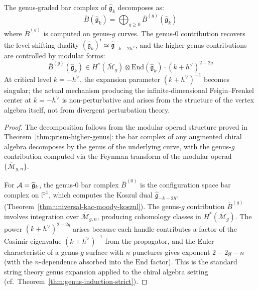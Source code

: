 \begin{theorem}\label{thm:km-higher-genus-corrections}
The genus-graded bar complex of $\widehat{\mathfrak{g}}_k$ decomposes as:
\begin{equation}
\bar{B}(\widehat{\mathfrak{g}}_k) = \bigoplus_{g \geq 0} \bar{B}^{(g)}(\widehat{\mathfrak{g}}_k)
\end{equation}
where $\bar{B}^{(g)}$ is computed on genus-$g$ curves.  The genus-$0$ contribution recovers the level-shifting duality $(\widehat{\mathfrak{g}}_k)^! \simeq \widehat{\mathfrak{g}}_{-k-2h^\vee}$, and the higher-genus contributions are controlled by modular forms:
\begin{equation}
\bar{B}^{(g)}(\widehat{\mathfrak{g}}_k) \in H^*(\overline{\mathcal{M}}_g) \otimes \mathrm{End}(\widehat{\mathfrak{g}}_k) \cdot (k+h^\vee)^{2-2g}
\end{equation}
At critical level $k = -h^\vee$, the expansion parameter $(k+h^\vee)^{-1}$ becomes singular; the actual mechanism producing the infinite-dimensional Feigin--Frenkel center at $k = -h^\vee$ is non-perturbative and arises from the structure of the vertex algebra itself, not from divergent perturbation theory.
\end{theorem}

\begin{proof}
The decomposition follows from the modular operad structure proved in Theorem~\ref{thm:prism-higher-genus}: the bar complex of any augmented chiral algebra decomposes by the genus of the underlying curve, with the genus-$g$ contribution computed via the Feynman transform of the modular operad $\{\overline{\mathcal{M}}_{g,n}\}$.

For $\mathcal{A} = \widehat{\mathfrak{g}}_k$, the genus-0 bar complex $\bar{B}^{(0)}$ is the configuration space bar complex on $\mathbb{P}^1$, which computes the Koszul dual $\widehat{\mathfrak{g}}_{-k-2h^\vee}$ (Theorem~\ref{thm:universal-kac-moody-koszul}).  The genus-$g$ contribution $\bar{B}^{(g)}$ involves integration over $\overline{\mathcal{M}}_{g,n}$, producing cohomology classes in $H^*(\overline{\mathcal{M}}_g)$.  The power $(k+h^\vee)^{2-2g}$ arises because each handle contributes a factor of the Casimir eigenvalue $(k+h^\vee)^{-1}$ from the propagator, and the Euler characteristic of a genus-$g$ surface with $n$ punctures gives exponent $2-2g-n$ (with the $n$-dependence absorbed into the $\mathrm{End}$ factor).  This is the standard string theory genus expansion applied to the chiral algebra setting (cf.\ Theorem~\ref{thm:genus-induction-strict}).
\end{proof}

